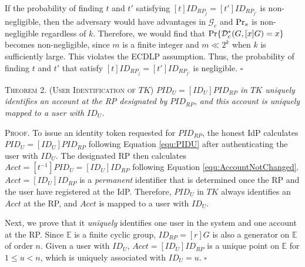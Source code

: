 \newc
If the probability of finding $t$ and $t'$ satisfying $[t]ID_{RP_j} = [t']ID_{RP_{j'}}$ is non-negligible,
 then the adversary would have advantages in $\mathcal{G}_c$ and ${\rm Pr}_s$ is non-negligible regardless of $k$.
Therefore, we would find that ${\rm Pr}\{\mathcal{D}^*_c(G, [x]G)=x\}$ becomes non-negligible, since $m$ is a finite integer and $m \ll 2^k$ when $k$ is sufficiently large.
\oldc
This violates the ECDLP assumption. Thus, the probability of finding $t$ and $t'$ that satisfy $[t]ID_{RP_j} = [t']ID_{RP_{j'}}$ is negligible. \hfill $\square$


\newc
\vspace{3mm}
\noindent\textsc{Theorem 2. (User Identification of $TK$)} {\em $PID_U= [ID_U]PID_{RP}$ in $TK$ uniquely identifies an account at the RP designated by $PID_{RP}$, and this account is uniquely mapped to a user with $ID_U$.}


\vspace{0.75mm}
\noindent\textsc{Proof.}
To issue an identity token requested for $PID_{RP}$, the honest IdP calculates $PID_U = [ID_U]PID_{RP}$ following Equation \ref{equ:PIDU} after authenticating the user with $ID_U$. The designated RP then calculates $Acct = [t^{-1}]PID_{U} = [ID_U]ID_{RP}$ following Equation \ref{equ:AccountNotChanged}.
$Acct = [ID_U]ID_{RP}$ is a \emph{permanent} identifier that is determined once the RP and the user have registered at the IdP. Therefore, $PID_U$ in $TK$ always identifies an $Acct$ at the RP, and $Acct$ is mapped to a user with $ID_U$.

Next, we prove that it \emph{uniquely} identifies one user in the system and one account at the RP. Since $\mathbb{E}$ is a finite cyclic group, $ID_{RP} = [r]G$ is also a generator on $\mathbb{E}$ of order $n$. Given a user with $ID_U$, $Acct = [ID_U]ID_{RP}$ is a unique point on $\mathbb{E}$ for $1 \leq u < n$, which is uniquely associated with $ID_U=u$. \hfill $\square$


